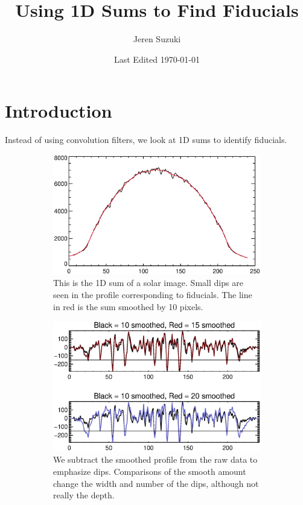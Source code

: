 \documentclass[10pt]{scrartcl}
\title{Using 1D Sums to Find Fiducials}
\author{Jeren Suzuki}
\date{Last Edited \today}
\begin{document}
\maketitle
{}
\tableofcontents
\clearpage
{}

\section{Introduction} %
\label{sec:introduction}
Instead of using convolution filters, we look at 1D sums to identify fiducials. 

\begin{figure}[!ht]
    \begin{subfigure}[b]{.5\linewidth}
        \centering
        \includegraphics[width=\linewidth]{../plots_tables_images/smooth_expl.eps}
        \caption{This is the 1D sum of a solar image. Small dips are seen in the profile corresponding to fiducials. The line in red is the sum smoothed by 10 pixels.}
    \end{subfigure}
    \begin{subfigure}[b]{.5\linewidth}
        \centering
        \includegraphics[width=\linewidth]{../plots_tables_images/smoothcomp.eps}
        \caption{We subtract the smoothed profile from the raw data to emphasize dips. Comparisons of the smooth amount change the width and number of the dips, although not really the depth.}
        \label{threshed}
    \end{subfigure}
    \caption{}
    \label{smoothed}
\end{figure}
\end{document}
